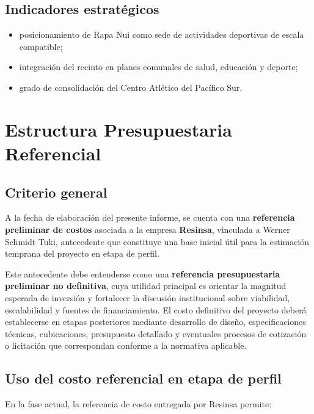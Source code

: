 \documentclass[12pt,letterpaper]{article}
\begin{document}
\subsection{Indicadores estratégicos}

\begin{itemize}
    \item posicionamiento de Rapa Nui como sede de actividades deportivas de escala compatible;
    \item integración del recinto en planes comunales de salud, educación y deporte;
    \item grado de consolidación del Centro Atlético del Pacífico Sur.
\end{itemize}

\section{Estructura Presupuestaria Referencial}

\subsection{Criterio general}

A la fecha de elaboración del presente informe, se cuenta con una \textbf{referencia preliminar de costos} asociada a la empresa \textbf{Resinsa}, vinculada a Werner Schmidt Tuki, antecedente que constituye una base inicial útil para la estimación temprana del proyecto en etapa de perfil.

Este antecedente debe entenderse como una \textbf{referencia presupuestaria preliminar no definitiva}, cuya utilidad principal es orientar la magnitud esperada de inversión y fortalecer la discusión institucional sobre viabilidad, escalabilidad y fuentes de financiamiento. El costo definitivo del proyecto deberá establecerse en etapas posteriores mediante desarrollo de diseño, especificaciones técnicas, cubicaciones, presupuesto detallado y eventuales procesos de cotización o licitación que correspondan conforme a la normativa aplicable.

\subsection{Uso del costo referencial en etapa de perfil}

En la fase actual, la referencia de costo entregada por Resinsa permite:
\end{document}
